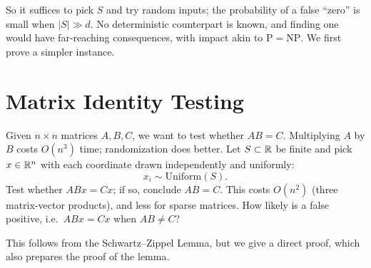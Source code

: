 
So it suffices to pick $S$ and try random inputs; the probability of a false
``zero'' is small when $|S| \gg d$. No deterministic counterpart is known, and
finding one would have far-reaching consequences, with impact akin to $\mathrm{P}
= \mathrm{NP}$. We first prove a simpler instance.

\section{Matrix Identity Testing}

Given $n \times n$ matrices $A, B, C$, we want to test whether $AB = C$.
Multiplying $A$ by $B$ costs $O(n^3)$ time; randomization does better. Let
$S \subset \mathbb{R}$ be finite and pick $x \in \mathbb{R}^n$ with each coordinate drawn
independently and uniformly:
\[
x_i \sim \mathrm{Uniform}(S).
\]
Test whether $ABx = Cx$; if so, conclude $AB = C$. This costs $O(n^2)$ (three
matrix-vector products), and less for sparse matrices. How likely is a false
positive, i.e.\ $ABx = Cx$ when $AB \neq C$?


This follows from the Schwartz--Zippel Lemma, but we give a direct proof, which
also prepares the proof of the lemma.

